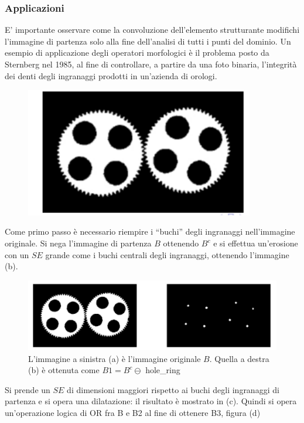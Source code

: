 \subsubsection{Applicazioni}

E' importante osservare come la convoluzione dell'elemento strutturante modifichi l'immagine di partenza solo alla fine
dell'analisi di tutti i punti del dominio. Un esempio di applicazione degli operatori morfologici è il problema posto da Sternberg nel 1985, al fine di controllare, a
partire da una foto binaria, l'integrità dei denti degli ingranaggi prodotti in un'azienda di orologi.

\begin{figure}[H]
    \centering
    \includegraphics[width=10cm, keepaspectratio]{capitoli/immagini/imgs/orologi-esempio.png}
\end{figure}

Come primo passo è necessario riempire i “buchi” degli ingranaggi nell'immagine originale.
Si nega l'immagine di partenza $B$ ottenendo $B^c$ e si effettua un'erosione
con un $SE$ grande come i buchi centrali degli ingranaggi, ottenendo
l'immagine (b).

\begin{figure}[H]
    \centering
    \includegraphics[width=\linewidth, keepaspectratio]{capitoli/immagini/imgs/orologi2.png}
    \caption{L'immagine a sinistra (a) è l'immagine originale $B$. Quella a destra (b) è ottenuta come $B1=B^c \ominus$ hole\_ring}
\end{figure}

Si prende un $SE$ di dimensioni maggiori rispetto ai buchi degli ingranaggi di partenza e si opera una dilatazione: il risultato è
mostrato in (c). Quindi si opera un'operazione logica di OR fra B e B2 al fine di ottenere B3, figura (d)

